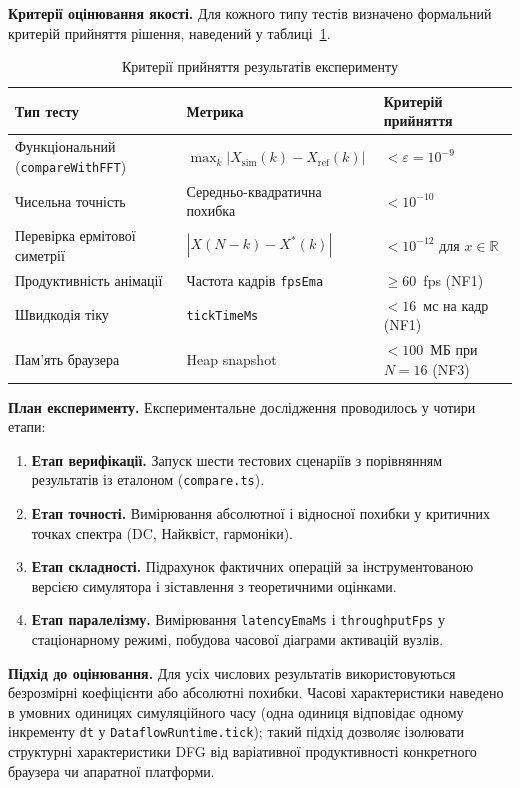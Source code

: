 \textbf{Критерії оцінювання якості.} Для кожного типу тестів визначено
формальний критерій прийняття рішення, наведений у
таблиці~\ref{tab:acceptance_criteria}.

\begin{table}[H]
  \caption{Критерії прийняття результатів експерименту}
  \label{tab:acceptance_criteria}
  \centering
  \begin{tabular}{p{4.0cm}p{4.5cm}p{5.5cm}}
    \toprule
    Тип тесту & Метрика & Критерій прийняття \\
    \midrule
    Функціональний (\texttt{compareWithFFT}) &
      $\max_k |X_{\text{sim}}(k) - X_{\text{ref}}(k)|$ &
      $< \varepsilon = 10^{-9}$ \\
    Чисельна точність &
      Середньо-квадратична похибка &
      $< 10^{-10}$ \\
    Перевірка ермітової симетрії &
      $|X(N{-}k) - X^*(k)|$ &
      $< 10^{-12}$ для $x \in \mathbb{R}$ \\
    Продуктивність анімації &
      Частота кадрів \texttt{fpsEma} &
      $\geq 60$~fps (NF1) \\
    Швидкодія тіку &
      \texttt{tickTimeMs} &
      $< 16$~мс на кадр (NF1) \\
    Пам'ять браузера &
      Heap snapshot &
      $< 100$~МБ при $N=16$ (NF3) \\
    \bottomrule
  \end{tabular}
\end{table}

\textbf{План експерименту.} Експериментальне дослідження проводилось
у чотири етапи:

\begin{enumerate}
  \item \textbf{Етап верифікації.} Запуск шести тестових сценаріїв з
    порівнянням результатів із еталоном (\texttt{compare.ts}).
  \item \textbf{Етап точності.} Вимірювання абсолютної і відносної
    похибки у критичних точках спектра (DC, Найквіст, гармоніки).
  \item \textbf{Етап складності.} Підрахунок фактичних операцій за
    інструментованою версією симулятора і зіставлення з теоретичними
    оцінками.
  \item \textbf{Етап паралелізму.} Вимірювання \texttt{latencyEmaMs} і
    \texttt{throughputFps} у стаціонарному режимі, побудова часової
    діаграми активацій вузлів.
\end{enumerate}

\textbf{Підхід до оцінювання.} Для усіх числових результатів
використовуються безрозмірні коефіцієнти або абсолютні похибки.
Часові характеристики наведено в умовних одиницях симуляційного
часу (одна одиниця відповідає одному інкременту \texttt{dt} у
\texttt{DataflowRuntime.tick}); такий підхід дозволяє ізолювати
структурні характеристики DFG від варіативної продуктивності
конкретного браузера чи апаратної платформи.


